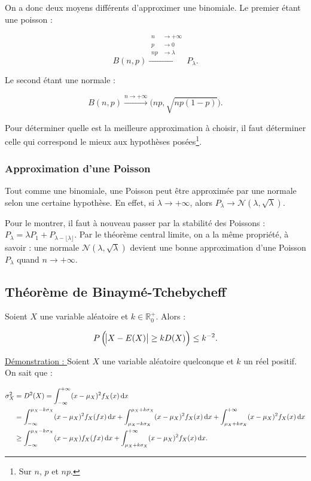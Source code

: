 \documentclass{article}
\begin{document}
			On a donc deux moyens différents d'approximer une binomiale. Le premier étant une poisson :

			\[B(n, p) \stackrel{\begin{aligned}n&\to+\infty\\p&\to0\\np&\to\lambda\end{aligned}}{\longrightarrow}P_\lambda.\]

			Le second étant une normale :

			\[B(n, p) \stackrel{n\to+\infty}{\longrightarrow}\mathcal(np, \sqrt {np(1-p)}).\]

			Pour déterminer quelle est la meilleure approximation à choisir, il faut déterminer celle qui correspond le mieux aux hypothèses posées\footnote{Sur $n$, $p$ et $np$.}.

		\subsubsection{Approximation d'une Poisson}
			Tout comme une binomiale, une Poisson peut être approximée par une normale selon une certaine hypothèse. En effet, si $\lambda \to +\infty$, alors
			$P_\lambda \to \mathcal N(\lambda, \sqrt \lambda)$.

			Pour le montrer, il faut à nouveau passer par la stabilité des Poissons : $P_\lambda = \lambda P_1 + P_{\lambda-\lfloor\lambda\rfloor}$. Par le théorème central limite,
			on a la même propriété, à savoir : une normale $\mathcal N(\lambda, \sqrt \lambda)$ devient une bonne approximation d'une Poisson $P_\lambda$ quand $n \to +\infty$.

	\subsection{Théorème de Binaymé-Tchebycheff}
		Soient $X$ une variable aléatoire et $k \in \mathbb R_0^+$. Alors :

		\[P\left(\abs{X-E(X)} \geq kD(X)\right) \leq k^{-2}.\]

		\underline{Démonstration : } Soient $X$ une variable aléatoire quelconque et $k$ un réel positif. On sait que :
		
		\begin{align*}
			\sigma_X^2 &= D^2(X) = \int_{-\infty}^{+\infty}(x-\mu_X)^2f_X(x)\dif x \\
			           &= \int_{-\infty}^{\mu_X-k\sigma_X} (x-\mu_X)^2f_X(fx)\dif x + \int_{\mu_X - k\sigma_X}^{\mu_X + k\sigma_X}(x-\mu_X)^2f_X(x)\dif x + \int_{\mu_X + k\sigma_X}^{+\infty}(x-\mu_X)^2f_X(x)\dif x \\
					   &\geq \int_{-\infty}^{\mu_X-k\sigma_X}(x-\mu_X)f_X(fx)\dif x + \int_{\mu_X + k\sigma_X}^{+\infty}(x-\mu_X)^2f_X(x)\dif x.
		\end{align*}
\end{document}
